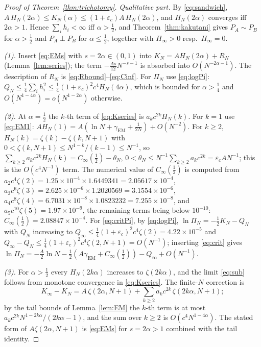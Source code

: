 \documentclass[11pt,reqno]{amsart}
\theoremstyle{plain}
\theoremstyle{definition}
\theoremstyle{remark}
\numberwithin{equation}{section}
\newcommand{\PA}{P_{A}}
\newcommand{\PB}{P_{B}}
\begin{document}
\begin{proof}[Proof of Theorem~\ref{thm:trichotomy}]
\emph{Qualitative part.} By \eqref{eq:sandwich}, $A\,H_N(2\alpha)\le K_N(\alpha)\le(1+\varepsilon_c)A\,H_N(2\alpha)$, and $H_N(2\alpha)$ converges iff $2\alpha>1$. Hence $\sum_ih_i<\infty$ iff $\alpha>\frac12$, and Theorem~\ref{thm:kakutani} gives $\PA\sim\PB$ for $\alpha>\frac12$ and $\PA\perp\PB$ for $\alpha\le\frac12$, together with $\Pi_\infty>0$ resp.\ $\Pi_\infty=0$.

\emph{(1).} Insert \eqref{eq:EMs} with $s=2\alpha\in(0,1)$ into $K_N=AH_N(2\alpha)+R_N$ (Lemma~\ref{lem:series}); the term $-\frac{A s}{12}N^{-s-1}$ is absorbed into $O(N^{-2\alpha-1})$. The description of $R_N$ is \eqref{eq:Rbound}--\eqref{eq:Cinf}. For $\Pi_N$ use \eqref{eq:logPi}: $Q_N\le\frac14\sum_ih_i^2\le\frac14(1+\varepsilon_c)^2c^4H_N(4\alpha)$, which is bounded for $\alpha>\frac14$ and $O(N^{1-4\alpha})=o(N^{1-2\alpha})$ otherwise.

\emph{(2).} At $\alpha=\frac12$ the $k$-th term of \eqref{eq:Kseries} is $a_kc^{2k}H_N(k)$. For $k=1$ use \eqref{eq:EM1}: $AH_N(1)=A(\ln N+\gamma_{\mathrm{EM}}+\frac1{2N})+O(N^{-2})$. For $k\ge2$, $H_N(k)=\zeta(k)-\zeta(k,N+1)$ with $0<\zeta(k,N+1)\le N^{1-k}/(k-1)\le N^{-1}$, so $\sum_{k\ge2}a_kc^{2k}H_N(k)=C_\infty(\frac12)-\theta_N$, $0<\theta_N\le N^{-1}\sum_{k\ge2}a_kc^{2k}=\varepsilon_cAN^{-1}$; this is the $O(c^4N^{-1})$ term. The numerical value of $C_\infty(\frac12)$ is computed from $a_2c^4\zeta(2)=1.25\times10^{-4}\times1.6449341=2.05617\times10^{-4}$, $a_3c^6\zeta(3)=2.625\times10^{-6}\times1.2020569=3.1554\times10^{-6}$, $a_4c^8\zeta(4)=6.7031\times10^{-8}\times1.0823232=7.255\times10^{-8}$, and $a_5c^{10}\zeta(5)=1.97\times10^{-9}$, the remaining terms being below $10^{-10}$: $C_\infty(\frac12)=2.08847\times10^{-4}$. For \eqref{eq:critPi}, by \eqref{eq:logPi}, $\ln\Pi_N=-\frac12K_N-Q_N$ with $Q_N$ increasing to $Q_\infty\le\frac14(1+\varepsilon_c)^2c^4\zeta(2)=4.22\times10^{-5}$ and $Q_\infty-Q_N\le\frac14(1+\varepsilon_c)^2c^4\zeta(2,N+1)=O(N^{-1})$; inserting \eqref{eq:crit} gives $\ln\Pi_N=-\frac A2\ln N-\frac12(A\gamma_{\mathrm{EM}}+C_\infty(\frac12))-Q_\infty+O(N^{-1})$.

\emph{(3).} For $\alpha>\frac12$ every $H_N(2k\alpha)$ increases to $\zeta(2k\alpha)$, and the limit \eqref{eq:sub} follows from monotone convergence in \eqref{eq:Kseries}. The finite-$N$ correction is
\[
K_\infty-K_N=A\,\zeta(2\alpha,N+1)+\sum_{k\ge2}a_kc^{2k}\,\zeta(2k\alpha,N+1);
\]
by the tail bounds of Lemma~\ref{lem:EM} the $k$-th term is at most $a_kc^{2k}N^{1-2k\alpha}/(2k\alpha-1)$, and the sum over $k\ge2$ is $O(c^4N^{1-4\alpha})$. The stated form of $A\zeta(2\alpha,N+1)$ is \eqref{eq:EMs} for $s=2\alpha>1$ combined with the tail identity.
\end{proof}
\end{document}
